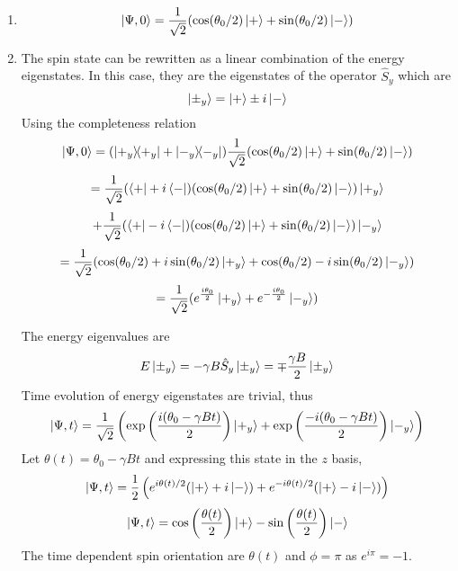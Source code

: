 \begin{sol}
\begin{enumerate}[label=\textbf{(\alph*)}]
    \item
    \begin{equation}
	\ket{\Psi,0}=\frac{1}{\sqrt{2}}(\cos(\theta_0/2)\ket++\sin(\theta_0/2)\ket-)
\end{equation}
    \item
    The spin state can be rewritten as a linear combination of the energy eigenstates. In this case, they are the eigenstates of the operator $\hat S_y$ which are 
    \begin{equation}
	\ket{\pm_y}=\ket+\pm i\ket-
\end{equation}
    Using the completeness relation
    \begin{equation}
	\ket{\Psi,0}=(\ketbra{+_y}{+_y}+\ketbra{-_y}{-_y})\frac{1}{\sqrt{2}}(\cos(\theta_0/2)\ket++\sin(\theta_0/2)\ket-)
\end{equation}
    \begin{equation}
	=\frac{1}{\sqrt{2}}(\bra++i\bra-)(\cos(\theta_0/2)\ket++\sin(\theta_0/2)\ket-)\ket{+_y}
\end{equation}
    \begin{equation}
	+\frac{1}{\sqrt{2}}(\bra+-i\bra-)(\cos(\theta_0/2)\ket++\sin(\theta_0/2)\ket-)\ket{-_y}
\end{equation}
    \begin{equation}
	=\frac{1}{\sqrt{2}}(\cos(\theta_0/2)+i\sin(\theta_0/2)\ket{+_y}+\cos(\theta_0/2)-i\sin(\theta_0/2)\ket{-_y})
\end{equation}
    \begin{equation}
	=\frac{1}{\sqrt{2}}(e^{\frac{i\theta_0}{2}}\ket{+_y}+e^{-\frac{i\theta_0}{2}}\ket{-_y})
\end{equation}
    
    The energy eigenvalues are 
    \begin{equation}
	E\ket{\pm_y}=-\gamma B\hat S_y\ket{\pm_y}=\mp\frac{\gamma B}{2}\ket{\pm_y}
\end{equation}
    Time evolution of energy eigenstates are trivial, thus
    \begin{equation}
	\ket{\Psi,t}=\frac{1}{\sqrt{2}}\left(\exp\left(\frac{i(\theta_0-\gamma Bt)}{2}\right)\ket{+_y}+\exp\left(\frac{-i(\theta_0-\gamma Bt)}{2}\right)\ket{-_y}\right)
\end{equation}
    Let $\theta(t)=\theta_0-\gamma Bt$ and expressing this state in the $z$ basis,
    \begin{equation}
	\ket{\Psi,t}=\frac{1}{2}\left(e^{i\theta(t)/2}(\ket++i\ket-)+e^{-i\theta(t)/2}(\ket+-i\ket-)\right)
\end{equation}
    \begin{equation}
	\ket{\Psi,t}=\cos\left(\frac{\theta(t)}{2}\right)\ket+-\sin\left(\frac{\theta(t)}{2}\right)\ket-
\end{equation}
    The time dependent spin orientation are $\theta(t)$ and $\phi=\pi$ as $e^{i\pi}=-1$.
\end{enumerate}
\end{sol}